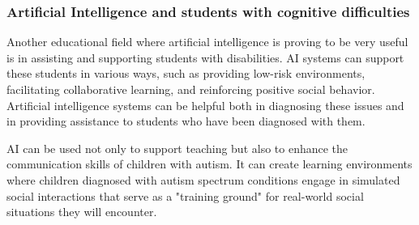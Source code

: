\documentclass[a4paper,12pt]{article}
\begin{document}

\subsubsection{Artificial Intelligence and students with cognitive difficulties}
Another educational field where artificial intelligence is proving to be very useful is in assisting and supporting students with disabilities. AI systems can support these students in various ways, such as providing low-risk environments, facilitating collaborative learning, and reinforcing positive social behavior\cite{salas2022artificial}.
Artificial intelligence systems can be helpful both in diagnosing these issues and in providing assistance to students who have been diagnosed with them\cite{drigas2013review}.

AI can be used not only to support teaching but also to enhance the communication skills of children with autism. It can create learning environments where children diagnosed with autism spectrum conditions engage in simulated social interactions that serve as a "training ground" for real-world social situations they will encounter\cite{porayska2018blending}.
\end{document}
